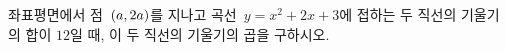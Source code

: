 좌표평면에서 점~$(a{,}\mkern3mu 2a)$를 지나고 곡선~$y=x^2+2x+3$에 접하는 두 직선의 기울기의 합이 $12$일 때, 이 두 직선의 기울기의 곱을 구하시오.

